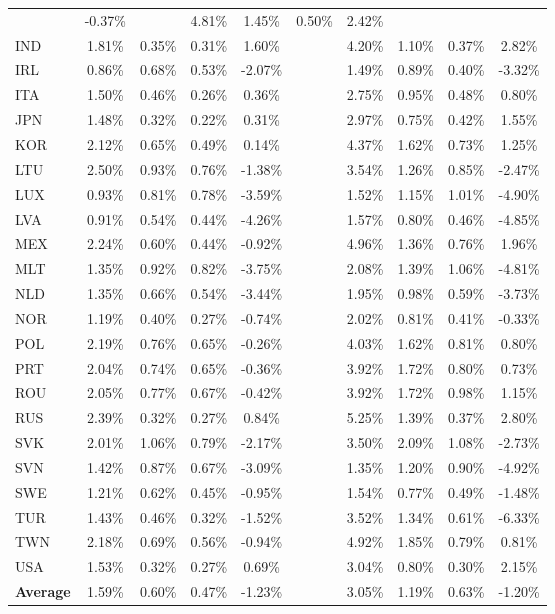 \begin{tabular}{lccccccccc}
&-0.37\% &&4.81\% & 1.45\% & 0.50\% & 2.42\% \\IND & 1.81\% & 0.35\% & 0.31\% &1.60\% &&4.20\% & 1.10\% & 0.37\% & 2.82\% \\IRL & 0.86\% & 0.68\% & 0.53\% &-2.07\% &&1.49\% & 0.89\% & 0.40\% & -3.32\% \\ITA & 1.50\% & 0.46\% & 0.26\% &0.36\% &&2.75\% & 0.95\% & 0.48\% & 0.80\% \\JPN & 1.48\% & 0.32\% & 0.22\% &0.31\% &&2.97\% & 0.75\% & 0.42\% & 1.55\% \\KOR & 2.12\% & 0.65\% & 0.49\% &0.14\% &&4.37\% & 1.62\% & 0.73\% & 1.25\% \\LTU & 2.50\% & 0.93\% & 0.76\% &-1.38\% &&3.54\% & 1.26\% & 0.85\% & -2.47\% \\LUX & 0.93\% & 0.81\% & 0.78\% &-3.59\% &&1.52\% & 1.15\% & 1.01\% & -4.90\% \\LVA & 0.91\% & 0.54\% & 0.44\% &-4.26\% &&1.57\% & 0.80\% & 0.46\% & -4.85\% \\MEX & 2.24\% & 0.60\% & 0.44\% &-0.92\% &&4.96\% & 1.36\% & 0.76\% & 1.96\% \\MLT & 1.35\% & 0.92\% & 0.82\% &-3.75\% &&2.08\% & 1.39\% & 1.06\% & -4.81\% \\NLD & 1.35\% & 0.66\% & 0.54\% &-3.44\% &&1.95\% & 0.98\% & 0.59\% & -3.73\% \\NOR & 1.19\% & 0.40\% & 0.27\% &-0.74\% &&2.02\% & 0.81\% & 0.41\% & -0.33\% \\POL & 2.19\% & 0.76\% & 0.65\% &-0.26\% &&4.03\% & 1.62\% & 0.81\% & 0.80\% \\PRT & 2.04\% & 0.74\% & 0.65\% &-0.36\% &&3.92\% & 1.72\% & 0.80\% & 0.73\% \\ROU & 2.05\% & 0.77\% & 0.67\% &-0.42\% &&3.92\% & 1.72\% & 0.98\% & 1.15\% \\RUS & 2.39\% & 0.32\% & 0.27\% &0.84\% &&5.25\% & 1.39\% & 0.37\% & 2.80\% \\SVK & 2.01\% & 1.06\% & 0.79\% &-2.17\% &&3.50\% & 2.09\% & 1.08\% & -2.73\% \\SVN & 1.42\% & 0.87\% & 0.67\% &-3.09\% &&1.35\% & 1.20\% & 0.90\% & -4.92\% \\SWE & 1.21\% & 0.62\% & 0.45\% &-0.95\% &&1.54\% & 0.77\% & 0.49\% & -1.48\% \\TUR & 1.43\% & 0.46\% & 0.32\% &-1.52\% &&3.52\% & 1.34\% & 0.61\% & -6.33\% \\TWN & 2.18\% & 0.69\% & 0.56\% &-0.94\% &&4.92\% & 1.85\% & 0.79\% & 0.81\% \\USA & 1.53\% & 0.32\% & 0.27\% &0.69\% &&3.04\% & 0.80\% & 0.30\% & 2.15\% \\ \addlinespace[3pt]
\textbf{Average} & 1.59\% & 0.60\% & 0.47\% & -1.23\% && 3.05\% & 1.19\% & 0.63\% & -1.20\% \\ \bottomrule
\end{tabular}
